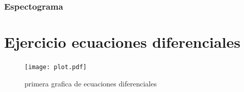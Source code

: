 \documentclass[11pt,letterpaper]{exam}
\begin{document}
\subsubsection{Espectograma}
\section{Ejercicio ecuaciones diferenciales}
\begin{figure}[H]
    \centering
    \texttt{[image: plot.pdf]}
    \caption{primera grafica de ecuaciones diferenciales}
    \label{fig:my_label}
\end{figure}
\end{document}
